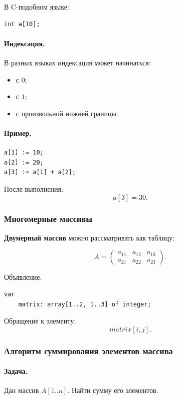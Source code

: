 \documentclass[12pt,a4paper]{article}
\begin{document}
В C-подобном языке:

\begin{verbatim}
int a[10];
\end{verbatim}

\paragraph{Индексация.}

В разных языках индексация может начинаться:
\begin{itemize}
    \item с $0$;
    \item с $1$;
    \item с произвольной нижней границы.
\end{itemize}

\paragraph{Пример.}

\begin{verbatim}
a[1] := 10;
a[2] := 20;
a[3] := a[1] + a[2];
\end{verbatim}

После выполнения:
\[
    a[3] = 30.
\]

\subsubsection{Многомерные массивы}

\textbf{Двумерный массив} можно рассматривать как таблицу:

\[
    A =
    \begin{pmatrix}
    a_{11} & a_{12} & a_{13}\\
    a_{21} & a_{22} & a_{23}
    \end{pmatrix}.
\]

Объявление:

\begin{verbatim}
var
    matrix: array[1..2, 1..3] of integer;
\end{verbatim}

Обращение к элементу:
\[
    matrix[i,j].
\]

\subsubsection{Алгоритм суммирования элементов массива}

\paragraph{Задача.}
Дан массив $A[1..n]$. Найти сумму его элементов.
\end{document}
